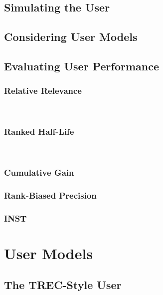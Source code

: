 \subsection{Simulating the User}\label{sec:ir_background:user:simulation}

\subsection{Considering User Models}\label{sec:ir_background:user:models}

\subsection{Evaluating User Performance}\label{sec:ir_background:user:evaluation}

\subsubsection{Relative Relevance}
~\cite{borlund1997iir_evaluation}

\subsubsection{Ranked Half-Life}
~\cite{borlund1997iir_evaluation}

\subsubsection{Cumulative Gain}

\subsubsection{Rank-Biased Precision}

\subsubsection{INST}

\section{User Models}

\subsection{The TREC-Style User}\label{sec:ir_background:user:models:trec}




